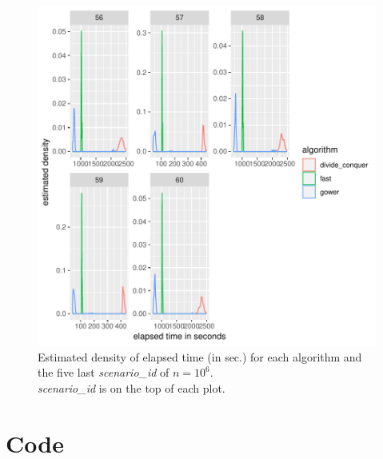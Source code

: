 \documentclass[11pt]{report}
\begin{document}
\begin{figure}[h]
\centering
    \includegraphics{./images/elapsed_time_1000000_part2.pdf}
    \caption{
    Estimated density of elapsed time (in sec.) for each algorithm and the five 
    last \textit{scenario\_id} of $n=10^6$.\\
    \textit{scenario\_id} is on the top of each plot.
    }
\end{figure}

\FloatBarrier

\chapter{Code}
\label{chap:code}
\end{document}
